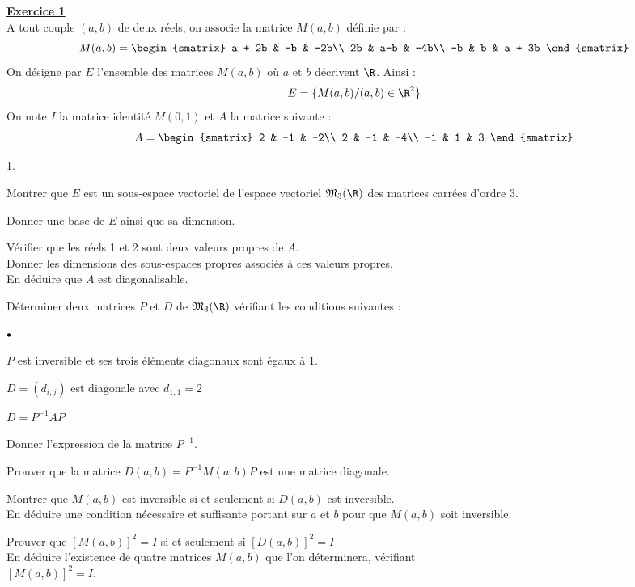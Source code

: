 \documentclass[11pt]{article}%
\begin{document}
\begin{center}
\end{center}
\vspace{1,5 cm}
\underline{\bf Exercice 1}\\
A tout couple $(a,b)$ de deux réels, on associe la matrice $M(a,b)$
définie par :
\[
M(a,b) = 
\begin{smatrix}
a + 2b & -b & -2b\\
2b & a-b & -4b\\
-b & b & a + 3b
\end{smatrix}
\]
On désigne par $E$ l'ensemble des matrices $M(a,b)$ où $a$ et $b$
décrivent $\R$. Ainsi : 
\[
E = \{M(a,b)/ (a,b)\in \R^{2} \}
\]
On note $I$ la matrice identité $M(0,1)$ et $A$ la matrice suivante :
\[
A = 
\begin{smatrix}
2 & -1 & -2\\
2 & -1 & -4\\
-1 & 1 & 3
\end{smatrix}
\]
\begin{noliste}{1.}
 \setlength{\itemsep}{4mm}
\item Montrer que $E$ est un sous-espace vectoriel de l'espace
vectoriel $\mathfrak{M}_{3}(\R)$ des matrices carrées d'ordre 3.
\item Donner une base de $E$ ainsi que sa dimension.
\item Vérifier que les réels 1 et 2 sont deux valeurs propres de $A$.\\
Donner les dimensions des sous-espaces propres associés à ces valeurs
propres. \\
En déduire que $A$ est diagonalisable.
\item Déterminer deux matrices $P$ et $D$ de $\mathfrak{M}_{3}(\R)$
vérifiant les conditions suivantes :
 \begin{noliste}{$\scriptstyle \bullet$}
 \item $P$ est inversible et ses trois éléments diagonaux sont égaux à
1.
 \item $D = (d_{i,j})$ est diagonale avec $d_{1,1} = 2$
 \item $D = P^{-1}AP$
 \end{noliste}
 Donner l'expression de la matrice $P^{-1}$.
\item Prouver que la matrice $D(a,b) = P^{-1}M(a,b)P$ est une matrice
diagonale.
\item Montrer que $M(a,b)$ est inversible si et seulement si $D(a,b)$
est inversible.\\
En déduire une condition nécessaire et suffisante portant sur $a$ et
$b$ pour que $M(a,b)$ soit inversible.
\item Prouver que $[M(a,b)]^{2} = I$ si et seulement si $[D(a,b)]^{2} =
I$\\
En déduire l'existence de quatre matrices $M(a,b)$ que l'on
déterminera, vérifiant \\
$[M(a,b)]^{2} = I$.
\end{noliste}
\end{document}
